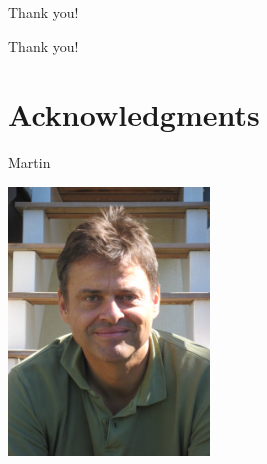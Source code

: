 \documentclass[10pt]{beamer}
\newenvironment{slide}[2][]
  {\begin{frame}[fragile,environment=slide,#1]{#2}}
  {\end{frame}}
\begin{document}
\begin{slide}{Thank you!}
\begin{center}
\Huge Thank you!
\end{center}
\end{slide}

\section{Acknowledgments}

\begin{slide}{Martin}
\begin{center}
\includegraphics[width=0.4\textwidth]{figures/martin.jpg}
\end{center}
\end{slide}
\end{document}
